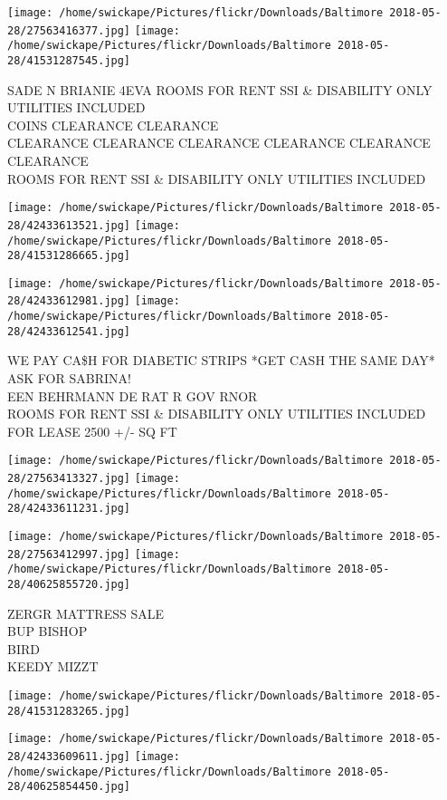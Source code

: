 \documentclass[10pt,letterpaper]{article}
\begin{document}
\texttt{[image: /home/swickape/Pictures/flickr/Downloads/Baltimore 2018-05-28/27563416377.jpg]}
\texttt{[image: /home/swickape/Pictures/flickr/Downloads/Baltimore 2018-05-28/41531287545.jpg]}

SADE N BRIANIE 4EVA ROOMS FOR RENT SSI \& DISABILITY ONLY UTILITIES INCLUDED\\
COINS CLEARANCE CLEARANCE\\
CLEARANCE CLEARANCE CLEARANCE CLEARANCE CLEARANCE CLEARANCE\\
ROOMS FOR RENT SSI \& DISABILITY ONLY UTILITIES INCLUDED\\
\pagebreak

\texttt{[image: /home/swickape/Pictures/flickr/Downloads/Baltimore 2018-05-28/42433613521.jpg]}
\texttt{[image: /home/swickape/Pictures/flickr/Downloads/Baltimore 2018-05-28/41531286665.jpg]}

\texttt{[image: /home/swickape/Pictures/flickr/Downloads/Baltimore 2018-05-28/42433612981.jpg]}
\texttt{[image: /home/swickape/Pictures/flickr/Downloads/Baltimore 2018-05-28/42433612541.jpg]}

WE PAY CA\$H FOR DIABETIC STRIPS *GET CASH THE SAME DAY* ASK FOR SABRINA!\\
EEN BEHRMANN DE RAT R GOV RNOR\\
ROOMS FOR RENT SSI \& DISABILITY ONLY UTILITIES INCLUDED\\
FOR LEASE 2500 +/{-} SQ FT\\
\pagebreak

\texttt{[image: /home/swickape/Pictures/flickr/Downloads/Baltimore 2018-05-28/27563413327.jpg]}
\texttt{[image: /home/swickape/Pictures/flickr/Downloads/Baltimore 2018-05-28/42433611231.jpg]}

\texttt{[image: /home/swickape/Pictures/flickr/Downloads/Baltimore 2018-05-28/27563412997.jpg]}
\texttt{[image: /home/swickape/Pictures/flickr/Downloads/Baltimore 2018-05-28/40625855720.jpg]}

ZERGR MATTRESS SALE\\
BUP BISHOP\\
BIRD\\
KEEDY MIZZT\\
\pagebreak

\texttt{[image: /home/swickape/Pictures/flickr/Downloads/Baltimore 2018-05-28/41531283265.jpg]}

\vspace{0.25in}
\texttt{[image: /home/swickape/Pictures/flickr/Downloads/Baltimore 2018-05-28/42433609611.jpg]}
\texttt{[image: /home/swickape/Pictures/flickr/Downloads/Baltimore 2018-05-28/40625854450.jpg]}
\end{document}
